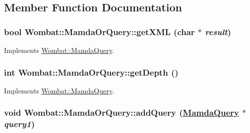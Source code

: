 \subsection{Member Function Documentation}
\hypertarget{classWombat_1_1MamdaOrQuery_ea04c3b997cb90ba9df6232f304e3baf}{
\subsubsection[getXML]{\setlength{\rightskip}{0pt plus 5cm}bool Wombat::Mamda\-Or\-Query::get\-XML (char $\ast$ {\em result})}}
\label{classWombat_1_1MamdaOrQuery_ea04c3b997cb90ba9df6232f304e3baf}




Implements \hyperlink{classWombat_1_1MamdaQuery_d5a4bbc29d9a752db0d07fa1e3aa2f25}{Wombat::Mamda\-Query}.\hypertarget{classWombat_1_1MamdaOrQuery_6c3978b27c90545a0271e3a9ffd40e38}{
\subsubsection[getDepth]{\setlength{\rightskip}{0pt plus 5cm}int Wombat::Mamda\-Or\-Query::get\-Depth ()}}
\label{classWombat_1_1MamdaOrQuery_6c3978b27c90545a0271e3a9ffd40e38}




Implements \hyperlink{classWombat_1_1MamdaQuery_1658aee7db0fd2fce15c63293c428597}{Wombat::Mamda\-Query}.\hypertarget{classWombat_1_1MamdaOrQuery_89aade080b1491f00222e2f7cb059569}{
\subsubsection[addQuery]{\setlength{\rightskip}{0pt plus 5cm}void Wombat::Mamda\-Or\-Query::add\-Query (\hyperlink{classWombat_1_1MamdaQuery}{Mamda\-Query} $\ast$ {\em query1})}}
\label{classWombat_1_1MamdaOrQuery_89aade080b1491f00222e2f7cb059569}


